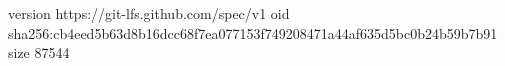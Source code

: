 version https://git-lfs.github.com/spec/v1
oid sha256:cb4eed5b63d8b16dcc68f7ea077153f749208471a44af635d5bc0b24b59b7b91
size 87544

